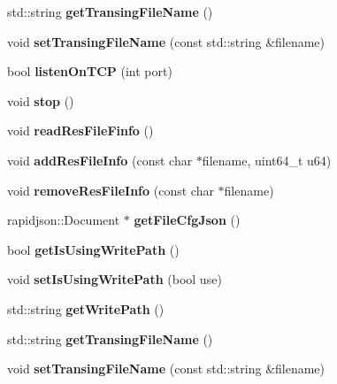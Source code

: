 \begin{DoxyCompactItemize}
\item 
\mbox{\label{classFileServer_a71270e1aa550adfd1d2c7873fdd492f8}} 
std\+::string {\bfseries get\+Transing\+File\+Name} ()
\item 
\mbox{\label{classFileServer_a132c88244d5dd33aa733b893a2ce77dc}} 
void {\bfseries set\+Transing\+File\+Name} (const std\+::string \&filename)
\item 
\mbox{\label{classFileServer_adb966da7fbc6412ca2a43856cfc695a0}} 
bool {\bfseries listen\+On\+T\+CP} (int port)
\item 
\mbox{\label{classFileServer_ac37e9a1c3f5a30c5f6aff839c013c0a2}} 
void {\bfseries stop} ()
\item 
\mbox{\label{classFileServer_a5c620c11f77bd59b62894712784f3810}} 
void {\bfseries read\+Res\+File\+Finfo} ()
\item 
\mbox{\label{classFileServer_a8756cd11fb16804099c94592c84b4794}} 
void {\bfseries add\+Res\+File\+Info} (const char $\ast$filename, uint64\+\_\+t u64)
\item 
\mbox{\label{classFileServer_aadf12d3ca48db06d5e809c87d4b49ee7}} 
void {\bfseries remove\+Res\+File\+Info} (const char $\ast$filename)
\item 
\mbox{\label{classFileServer_a26265371ddfdd4ef9c51d9852f3b6db0}} 
rapidjson\+::\+Document $\ast$ {\bfseries get\+File\+Cfg\+Json} ()
\item 
\mbox{\label{classFileServer_a77f8b4396ac234a2823eec62da214683}} 
bool {\bfseries get\+Is\+Using\+Write\+Path} ()
\item 
\mbox{\label{classFileServer_a3db338e383a7585ca0041f7de893ffd2}} 
void {\bfseries set\+Is\+Using\+Write\+Path} (bool use)
\item 
\mbox{\label{classFileServer_add801bb5fc8d7461af75b9046c911d31}} 
std\+::string {\bfseries get\+Write\+Path} ()
\item 
\mbox{\label{classFileServer_a71270e1aa550adfd1d2c7873fdd492f8}} 
std\+::string {\bfseries get\+Transing\+File\+Name} ()
\item 
\mbox{\label{classFileServer_a132c88244d5dd33aa733b893a2ce77dc}} 
void {\bfseries set\+Transing\+File\+Name} (const std\+::string \&filename)
\end{DoxyCompactItemize}
